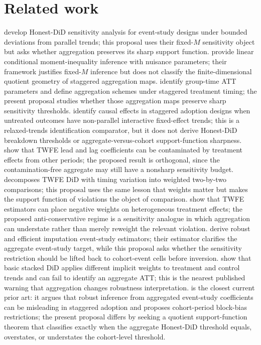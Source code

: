 \documentclass[11pt]{article}
\theoremstyle{definition}
\theoremstyle{plain}
\theoremstyle{remark}
\begin{document}
\section{Related work}
\citet{rambachan2023parallel} develop Honest-DiD sensitivity analysis for event-study designs under bounded deviations from parallel trends; this proposal uses their fixed-\(M\) sensitivity object but asks whether aggregation preserves its sharp support function.
\citet{andrews2023conditional} provide linear conditional moment-inequality inference with nuisance parameters; their framework justifies fixed-\(M\) inference but does not classify the finite-dimensional quotient geometry of staggered aggregation maps.
\citet{callaway2021multiple} identify group-time ATT parameters and define aggregation schemes under staggered treatment timing; the present proposal studies whether those aggregation maps preserve sharp sensitivity thresholds.
\citet{callaway2023nonparallel} identify causal effects in staggered adoption designs when untreated outcomes have non-parallel interactive fixed-effect trends; this is a relaxed-trends identification comparator, but it does not derive Honest-DiD breakdown thresholds or aggregate-versus-cohort support-function sharpness.
\citet{sunabraham2021eventstudy} show that TWFE lead and lag coefficients can be contaminated by treatment effects from other periods; the proposed result is orthogonal, since the contamination-free aggregate may still have a nonsharp sensitivity budget.
\citet{goodmanbacon2021timing} decomposes TWFE DiD with timing variation into weighted two-by-two comparisons; this proposal uses the same lesson that weights matter but makes the support function of violations the object of comparison.
\citet{dechaisemartin2020twfe} show that TWFE estimators can place negative weights on heterogeneous treatment effects; the proposed anti-conservative regime is a sensitivity analogue in which aggregation can understate rather than merely reweight the relevant violation.
\citet{borusyak2024eventstudy} derive robust and efficient imputation event-study estimators; their estimator clarifies the aggregate event-study target, while this proposal asks whether the sensitivity restriction should be lifted back to cohort-event cells before inversion.
\citet{wing2024stacked} show that basic stacked DiD applies different implicit weights to treatment and control trends and can fail to identify an aggregate ATT; this is the nearest published warning that aggregation changes robustness interpretation.
\citet{liu2025cohortanchored} is the closest current prior art: it argues that robust inference from aggregated event-study coefficients can be misleading in staggered adoption and proposes cohort-period block-bias restrictions; the present proposal differs by seeking a quotient support-function theorem that classifies exactly when the aggregate Honest-DiD threshold equals, overstates, or understates the cohort-level threshold.
\end{document}
